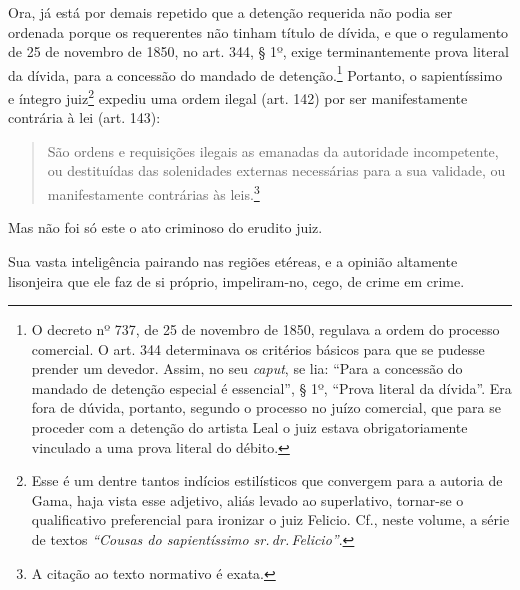 Ora, já está por demais repetido que a detenção requerida não podia ser
ordenada porque os requerentes não tinham título de dívida, e que o
regulamento de 25 de novembro de 1850, no art. 344, § 1º, exige
terminantemente prova literal da dívida, para a concessão do mandado de
detenção.\footnote{ O decreto nº 737, de 25 de novembro de 1850, regulava a ordem
  do processo comercial. O art. 344 determinava os critérios básicos
  para que se pudesse prender um devedor. Assim, no seu \emph{caput}, se
  lia: ``Para a concessão do mandado de detenção especial é essencial'', §
  1º, ``Prova literal da dívida''. Era fora de dúvida, portanto, segundo o
  processo no juízo comercial, que para se proceder com a detenção do
  artista Leal o juiz estava obrigatoriamente vinculado a uma prova
  literal do débito.} Portanto, o sapientíssimo e íntegro
juiz\footnote{ Esse é um dentre tantos indícios estilísticos que
  convergem para a autoria de Gama, haja vista esse adjetivo, aliás
  levado ao superlativo, tornar-se o qualificativo preferencial para
  ironizar o juiz Felicio. Cf., neste volume, a série de textos
  \emph{``Cousas do sapientíssimo sr.\,dr.\,Felicio''}.} expediu uma ordem
ilegal (art. 142) por ser manifestamente contrária à lei (art. 143):

\begin{quote}
São ordens e requisições ilegais as emanadas da autoridade
incompetente, ou destituídas das solenidades externas necessárias para a
sua validade, ou manifestamente contrárias às leis.\footnote{A citação ao texto normativo é exata.}
\end{quote}

Mas não foi só este o ato criminoso do erudito juiz.

Sua vasta inteligência pairando nas regiões etéreas, e a opinião
altamente lisonjeira que ele faz de si próprio, impeliram-no, cego, de
crime em crime.

